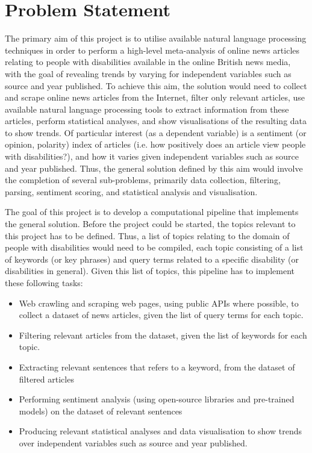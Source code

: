 \documentclass{report}
\begin{document}
\section{Problem Statement} \label{Problem Statement}

The primary aim of this project is to utilise available natural language processing techniques in order to perform a high-level meta-analysis of online news articles relating to people with disabilities available in the online British news media, with the goal of revealing trends by varying for independent variables such as source and year published.
To achieve this aim, the solution would need to collect and scrape online news articles from the Internet, filter only relevant articles, use available natural language processing tools to extract information from these articles, perform statistical analyses, and show visualisations of the resulting data to show trends.
Of particular interest (as a dependent variable) is a sentiment (or opinion, polarity) index of articles (i.e. how positively does an article view people with disabilities?), and how it varies given independent variables such as source and year published.
Thus, the general solution defined by this aim would involve the completion of several sub-problems, primarily data collection, filtering, parsing, sentiment scoring, and statistical analysis and visualisation.

The goal of this project is to develop a computational pipeline that implements the general solution.
Before the project could be started, the topics relevant to this project has to be defined.
Thus, a list of topics relating to the domain of people with disabilities would need to be compiled, each topic consisting of a list of keywords (or key phrases) and query terms related to a specific disability (or disabilities in general).
Given this list of topics, this pipeline has to implement these following tasks:
\begin{itemize}
	\item Web crawling and scraping web pages, using public APIs where possible, to collect a dataset of news articles, given the list of query terms for each topic.
	\item Filtering relevant articles from the dataset, given the list of keywords for each topic.
	\item Extracting relevant sentences that refers to a keyword, from the dataset of filtered articles
	\item Performing sentiment analysis (using open-source libraries and pre-trained models) on the dataset of relevant sentences
	\item Producing relevant statistical analyses and data visualisation to show trends over independent variables such as source and year published.
\end{itemize}
\end{document}
